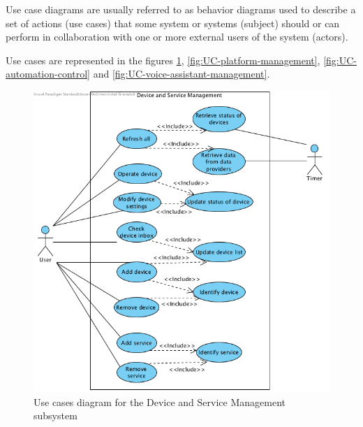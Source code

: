 Use case diagrams are usually referred to as behavior diagrams used to describe a set of actions (use cases) that some system or
systems (subject) should or can perform in collaboration with one or more external users of the system (actors).\cite{umlUseCaseDiagrams}

Use cases are represented in the figures \ref{fig:UC-device-and-service-management}, \ref{fig:UC-platform-management},
\ref{fig:UC-automation-control} and \ref{fig:UC-voice-assistant-management}.

\begin{figure}
	\centering
	\includegraphics[width=1\textwidth]{images/Chapter_06/UC-device-and-service-management.png}
	\caption{Use cases diagram for the Device and Service Management subsystem}
	\label{fig:UC-device-and-service-management}
\end{figure}

